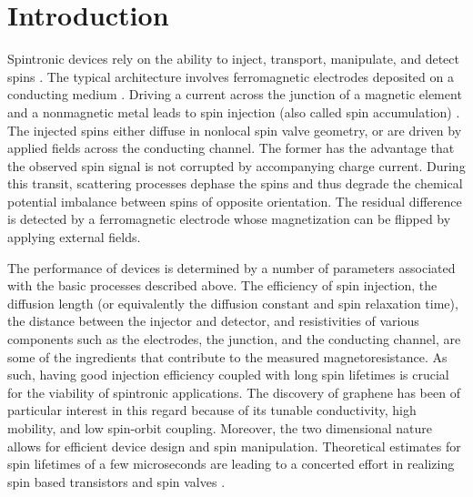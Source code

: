 \section{Introduction}

Spintronic devices rely on the ability to
inject, transport, manipulate, and detect spins
\cite{%
  Wolf16112001,%
  RevModPhys.76.323%
}.
The typical architecture involves ferromagnetic electrodes
deposited on a conducting medium
\cite{%
  1990ApPhL..56..665D,%
  Jedema2001%
}.
Driving a current across the junction of a magnetic element
and a nonmagnetic metal leads to spin injection (also called spin accumulation)
\cite{%
  PhysRevLett.55.1790,%
  Jedema2001,%
  Yang2008,%
  PhysRevLett.94.196601%
}.
The injected spins either diffuse in nonlocal spin valve geometry,
or are driven by applied fields across the conducting channel.
The former has the advantage that the observed spin signal
is not corrupted by accompanying charge current.
During this transit, scattering processes dephase the spins
and thus degrade the chemical potential imbalance
between spins of opposite orientation.
The residual difference is detected by a ferromagnetic electrode
whose magnetization can be flipped by applying external fields.

The performance of devices is determined by a number of parameters
associated with the basic processes described above.
The efficiency of spin injection, the diffusion length
(or equivalently the diffusion constant and spin relaxation time),
the distance between the injector and detector,
and resistivities of various components such as the electrodes,
the junction, and the conducting channel,
are some of the ingredients that contribute to the measured magnetoresistance.
As such, having good injection efficiency coupled with long spin lifetimes
is crucial for the viability of spintronic applications.
The discovery of graphene
\cite{Novoselov22102004}
has been of particular interest in this regard
because of its tunable conductivity, high mobility, and low spin-orbit coupling.
Moreover, the two dimensional nature allows
for efficient device design and spin manipulation.
Theoretical estimates for spin lifetimes of a few microseconds
\cite{%
  PhysRevB.74.155426,%
  Trauzettel2007%
}
are leading to a concerted effort in realizing
spin based transistors and spin valves
\cite{%
  Tombros2007,%
  JJAP.46.L605,%
  Cho2007,%
  PhysRevLett.101.046601,%
  1704408,%
  Han2012,%
  Han2012369,%
  PhysRevB.80.241403%
}.

